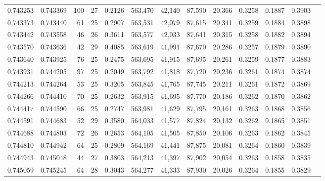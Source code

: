 \begin{tabular}{rrrrrrrrrrrrr}
0.743253 & 0.743369 &   100 &  27 &                                     0.2126 & 563,470 &  42,140 &  87,590 &  20,366 & 0.3258 & 0.1887 & 0.3903 \\
0.743373 & 0.743440 &    61 &  25 &                                     0.2907 & 563,531 &  42,079 &  87,615 &  20,341 & 0.3259 & 0.1884 & 0.3898 \\
0.743442 & 0.743558 &    46 &  26 &                                     0.3611 & 563,577 &  42,033 &  87,641 &  20,315 & 0.3258 & 0.1882 & 0.3894 \\
0.743570 & 0.743636 &    42 &  29 &                                     0.4085 & 563,619 &  41,991 &  87,670 &  20,286 & 0.3257 & 0.1879 & 0.3890 \\
0.743640 & 0.743925 &    76 &  25 &                                     0.2475 & 563,695 &  41,915 &  87,695 &  20,261 & 0.3259 & 0.1877 & 0.3883 \\
0.743931 & 0.744205 &    97 &  25 &                                     0.2049 & 563,792 &  41,818 &  87,720 &  20,236 & 0.3261 & 0.1874 & 0.3874 \\
0.744213 & 0.744264 &    53 &  25 &                                     0.3205 & 563,845 &  41,765 &  87,745 &  20,211 & 0.3261 & 0.1872 & 0.3869 \\
0.744266 & 0.744410 &    70 &  25 &                                     0.2632 & 563,915 &  41,695 &  87,770 &  20,186 & 0.3262 & 0.1870 & 0.3862 \\
0.744417 & 0.744590 &    66 &  25 &                                     0.2747 & 563,981 &  41,629 &  87,795 &  20,161 & 0.3263 & 0.1868 & 0.3856 \\
0.744591 & 0.744683 &    52 &  29 &                                     0.3580 & 564,033 &  41,577 &  87,824 &  20,132 & 0.3262 & 0.1865 & 0.3851 \\
0.744688 & 0.744803 &    72 &  26 &                                     0.2653 & 564,105 &  41,505 &  87,850 &  20,106 & 0.3263 & 0.1862 & 0.3845 \\
0.744810 & 0.744942 &    64 &  25 &                                     0.2809 & 564,169 &  41,441 &  87,875 &  20,081 & 0.3264 & 0.1860 & 0.3839 \\
0.744943 & 0.745048 &    44 &  27 &                                     0.3803 & 564,213 &  41,397 &  87,902 &  20,054 & 0.3263 & 0.1858 & 0.3835 \\
0.745059 & 0.745245 &    64 &  28 &                                     0.3043 & 564,277 &  41,333 &  87,930 &  20,026 & 0.3264 & 0.1855 & 0.3829 \\

\end{tabular}

